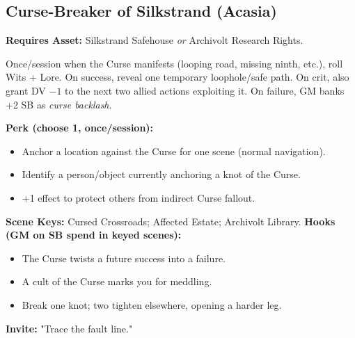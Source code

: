 \subsection{Curse-Breaker of Silkstrand (Acasia)}
\textbf{Requires Asset:} Silkstrand Safehouse \emph{or} Archivolt Research Rights.
\begin{tcolorbox}[enhanced,sharp corners,boxrule=.6pt,title={Talent — Follow the Unspooled Thread (7 XP)}]
Once/session when the Curse manifests (looping road, missing ninth, etc.), roll Wits + Lore. On success, reveal one temporary loophole/safe path. On crit, also grant DV $-1$ to the next two allied actions exploiting it. On failure, GM banks +2 SB as \emph{curse backlash}.
\end{tcolorbox}
\textbf{Perk (choose 1, once/session):}
\begin{itemize}
  \item Anchor a location against the Curse for one scene (normal navigation).
  \item Identify a person/object currently anchoring a knot of the Curse.
  \item +1 effect to protect others from indirect Curse fallout.
\end{itemize}
\textbf{Scene Keys:} Cursed Crossroads; Affected Estate; Archivolt Library.
\textbf{Hooks (GM on SB spend in keyed scenes):}
\begin{itemize}
  \item The Curse twists a future success into a failure.
  \item A cult of the Curse marks you for meddling.
  \item Break one knot; two tighten elsewhere, opening a harder leg.
\end{itemize}
\textbf{Invite:} "Trace the fault line."

